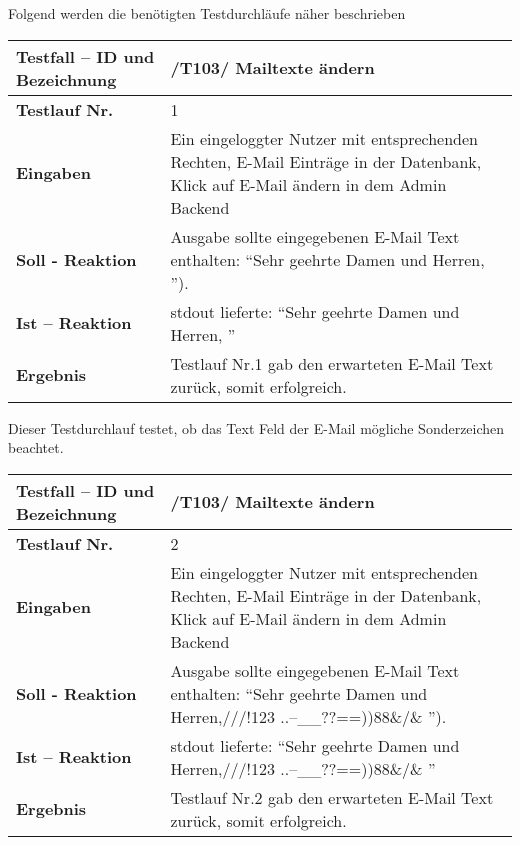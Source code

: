 Folgend werden die benötigten Testdurchläufe näher beschrieben
\begin{longtable}{|p{5cm}|p{10cm}|}
\hline
\textbf{Testfall -- ID und Bezeichnung} & \textnormal{/T103/ Mailtexte ändern} \\
\hline
\textbf{Testlauf Nr.} & \textnormal{1} \\
\hline
\textbf{Eingaben} & \textnormal{Ein eingeloggter Nutzer mit entsprechenden Rechten, E-Mail 
Einträge in der Datenbank, Klick auf E-Mail ändern in dem Admin Backend } \\
\hline
\textbf{Soll - Reaktion} & \textnormal{Ausgabe sollte eingegebenen E-Mail
Text enthalten: "`Sehr geehrte Damen und Herren, "').
} \\
\hline
\textbf{Ist -- Reaktion} & \textnormal{stdout lieferte: "`Sehr geehrte Damen und Herren, "'} \\
\hline
\textbf{Ergebnis} & \textnormal{Testlauf Nr.1 gab den erwarteten E-Mail Text zurück, somit erfolgreich.} \\
\hline
 \end{longtable}
 
Dieser Testdurchlauf testet, ob das Text Feld der E-Mail mögliche Sonderzeichen beachtet.
\begin{longtable}{|p{5cm}|p{10cm}|}
\hline
\textbf{Testfall -- ID und Bezeichnung} & \textnormal{/T103/ Mailtexte ändern} \\
\hline
\textbf{Testlauf Nr.} & \textnormal{2} \\
\hline
\textbf{Eingaben} & \textnormal{Ein eingeloggter Nutzer mit entsprechenden Rechten, E-Mail 
Einträge in der Datenbank, Klick auf E-Mail ändern in dem Admin Backend } \\
\hline
\textbf{Soll - Reaktion} & \textnormal{Ausgabe sollte eingegebenen E-Mail
Text enthalten: "`Sehr geehrte Damen und Herren,///!123 
                    ..--\_\_??==))88\&/\& "').
} \\
\hline
\textbf{Ist -- Reaktion} & \textnormal{stdout lieferte: "`Sehr geehrte Damen und Herren,///!123 
                    ..--\_\_??==))88\&/\& "'} \\
\hline
\textbf{Ergebnis} & \textnormal{Testlauf Nr.2 gab den erwarteten E-Mail Text zurück, somit erfolgreich.} \\
\hline
 \end{longtable} 
 

